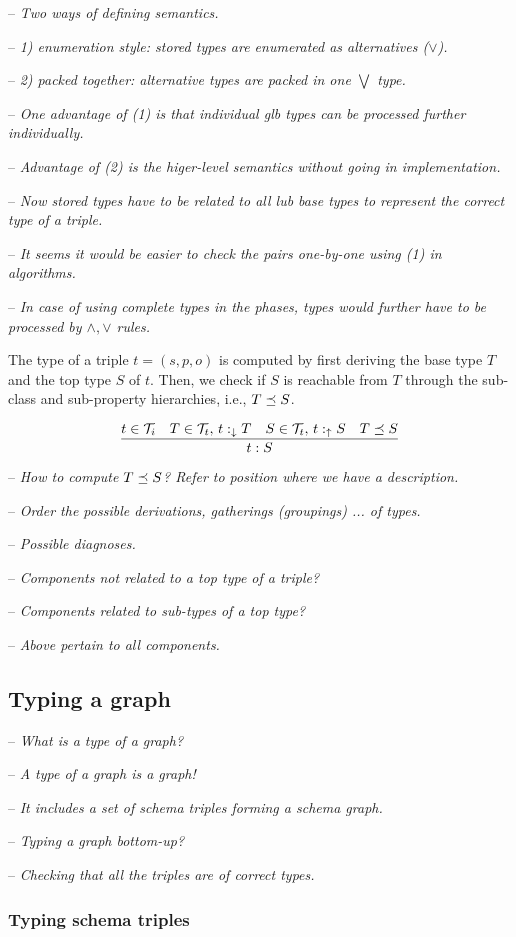 \documentclass[runningheads]{llncs}
\newcommand{\darr}{\downarrow}
\newcommand{\uarr}{\uparrow}
\newcommand{\T}{{\cal T}}
\newcommand{\notes}[1]{\noindent\begin{small}-- \emph{#1}\\\end{small}}
\begin{document}
\notes{Two ways of defining semantics.}
\notes{1) enumeration style: stored types are enumerated as alternatives ($\lor$).}
\notes{2) packed together: alternative types are packed in one $\bigvee$ type.}
\notes{One advantage of (1) is that individual glb types can be processed further individually.}
\notes{Advantage of (2) is the higer-level semantics without going in implementation.}

\notes{Now stored types have to be related to all lub base types to represent the correct type of a triple.}
\notes{It seems it would be easier to check the pairs one-by-one using (1) in algorithms.}
\notes{In case of using complete types in the phases, types would further have to be processed by $\land,\lor$ rules.}

The type of a triple $t=(s,p,o)$ is computed by first deriving the
base type $T$ and the top type $S$ of $t$. Then, we check if $S$ is
reachable from $T$ through the sub-class and sub-property hierarchies,
i.e., $T\preceq\/S$.

\begin{equation}
\dfrac{t\in\T_i\quad T\in\T_t,\, t:_{\darr}T\quad S\in\T_t,\, t:_\uarr\/S\quad T\preceq\/S}
      {t:S}
\end{equation}

\medskip

\medskip
\notes{How to compute $T\preceq\/S$? Refer to position where we have a description.}
\notes{Order the possible derivations, gatherings (groupings) ... of types.}

\notes{Possible diagnoses.}
\notes{Components not related to a top type of a triple?}
\notes{Components related to sub-types of a top type?}
\notes{Above pertain to all components.}




\subsection{Typing a graph}

\notes{What is a type of a graph?}
\notes{A type of a graph is a graph!}
\notes{It includes a set of schema triples forming a schema graph.}

\notes{Typing a graph bottom-up?}
\notes{Checking that all the triples are of correct types.}

\subsubsection{Typing schema triples}
\end{document}
